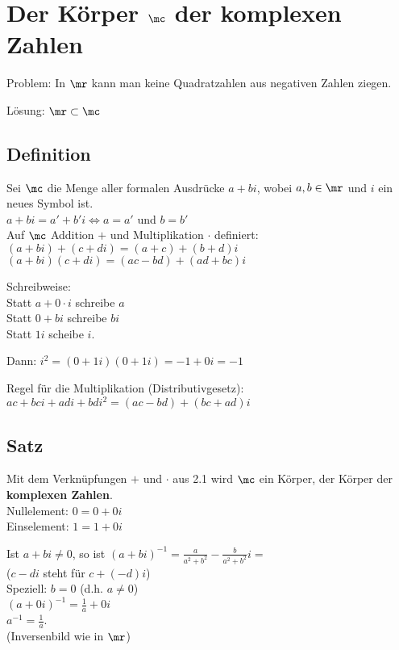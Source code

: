 \newpage
\section{Der Körper \texorpdfstring{$\mathbb{\mc}$}{C} der komplexen Zahlen}

Problem: In $\mr$ kann man keine Quadratzahlen aus negativen Zahlen ziegen.

Lösung: $\mr\subset\mc$

\subsection{Definition}
	Sei $\mc$ die Menge aller formalen Ausdrücke $a+bi$, wobei $a,b\in\mr$ und $i$ ein neues Symbol ist.\\
	$a+bi=a'+b'i\Leftrightarrow a=a'$ und $b=b'$\\
	Auf $\mc$ Addition $+$ und Multiplikation $\cdot$ definiert:\\
	$(a+bi)+(c+di)=(a+c)+(b+d)i$\\
	$(a+bi)(c+di)=(ac-bd)+(ad+bc)i$

	Schreibweise:\\
	Statt $a+0\cdot i$ schreibe $a$\\
	Statt $0+bi$ schreibe $bi$\\
	Statt $1i$ scheibe $i$.

	Dann: $i^2=(0+1i)(0+1i)=-1+0i=-1$

	Regel für die Multiplikation (Distributivgesetz):\\
	$ac+bci+adi+bdi^2=(ac-bd)+(bc+ad)i$

\subsection{Satz}
		\item Mit dem Verknüpfungen $+$ und $\cdot$ aus 2.1 wird $\mc$ ein Körper, der Körper der \textbf{komplexen Zahlen}.\\
		Nullelement: $0=0+0i$\\
		Einselement: $1=1+0i$
		\item Ist $a+bi\neq 0$, so ist $(a+bi)^{-1}=\frac{a}{a^2+b^2}-\frac{b}{a^2+b^2}i=$\\
		($c-di$ steht für $c+(-d)i$)\\
		Speziell: $b=0$ (d.h. $a\neq 0$)\\
		$(a+0i)^{-1}=\frac{1}{a}+0i$\\
		$a^{-1}=\frac{1}{a}$.\\
		(Inversenbild wie in $\mr$)

